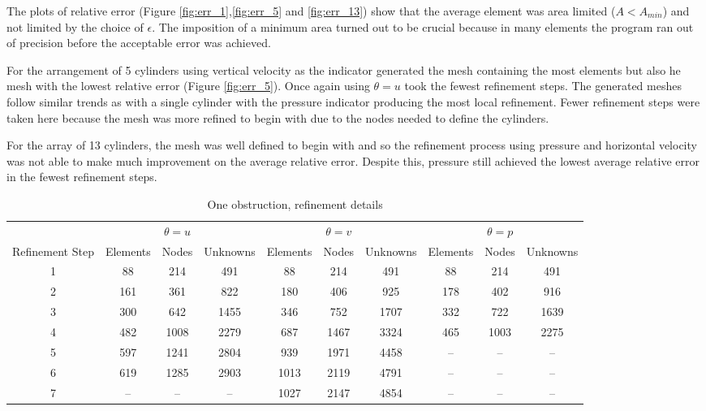 \documentclass[wrr]{agutex}  %
\begin{document}
\begin{article}
The plots of relative error (Figure \ref{fig:err_1},\ref{fig:err_5} and \ref{fig:err_13}) show that the average element was area limited ($A<A_{min}$) and not limited by the choice of $\epsilon$.  The imposition of a minimum area turned out to be crucial because in many elements the program ran out of precision before the acceptable error was achieved.  

For the arrangement of 5 cylinders using vertical velocity as the indicator generated the mesh containing the most elements but also he mesh with the lowest relative error (Figure \ref{fig:err_5}).  Once again using $\theta=u$ took the fewest refinement steps.  The generated meshes follow similar trends as with a single cylinder with the pressure indicator producing the most local refinement.  Fewer refinement steps were taken here because the mesh was more refined to begin with due to the nodes needed to define the cylinders.

For the array of 13 cylinders, the mesh was well defined to begin with and so the refinement process using pressure and horizontal velocity was not able to make much improvement on the average relative error.  Despite this, pressure still achieved the lowest average relative error in the fewest refinement steps.  \vfill

\begin{table}
\flushleft
\caption{One obstruction, refinement details}\label{tbl:1hole}
\begin{tabular}{cccccccccc}
\toprule
&& $\theta=u$& &&$\theta=v$& & &$\theta=p$&\\   
Refinement Step & Elements & Nodes & Unknowns & Elements & Nodes & Unknowns & Elements & Nodes & Unknowns\\
\midrule
1 & 88 & 214   & 491  & 88   & 214  & 491  & 88  & 214  & 491 \\
2 & 161 & 361  & 822  & 180  & 406  & 925  & 178 & 402  & 916\\
3 & 300 & 642  & 1455 & 346  & 752  & 1707 & 332 & 722  & 1639 \\
4 & 482 & 1008 & 2279 & 687  & 1467 & 3324 & 465 & 1003 & 2275 \\
5 & 597 & 1241 & 2804 & 939  & 1971 & 4458 & --  & --   & -- \\
6 & 619 & 1285 & 2903 & 1013 & 2119 & 4791 & --  & --   & -- \\
7 & --  & --   & --   & 1027 & 2147 & 4854 & --  & --   & -- \\
\bottomrule
\end{tabular}
\end{table}


\end{article}
\end{document}
